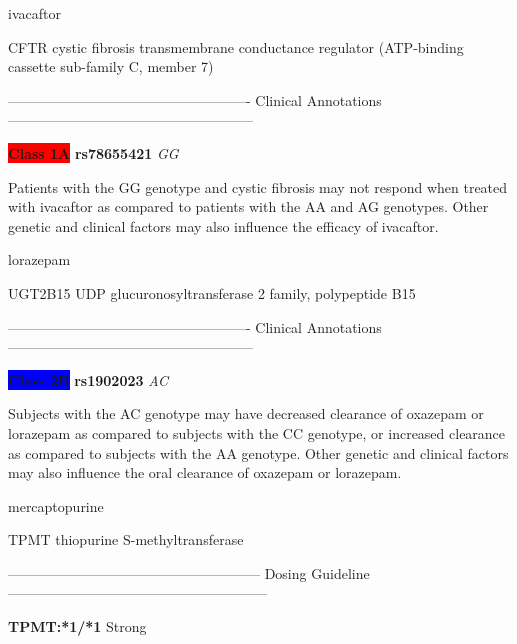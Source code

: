 \documentclass{resume} %
\begin{document}
\begin{rSection}{ ivacaftor }
\begin{rSubsection}{ CFTR }{ cystic fibrosis transmembrane conductance regulator (ATP-binding cassette sub-family C, member 7) }{}{}
\item[] ---------------------------------------------------- Clinical Annotations -----------------------------------------------------\newline
\item \textbf{\colorbox{red} {Class 1A}} \textbf{ rs78655421 } \textit{ GG }
\item[] Patients with the GG genotype and cystic fibrosis may not respond when treated with ivacaftor as compared to patients with the AA and AG genotypes. Other genetic and clinical factors may also influence the efficacy of ivacaftor.
\end{rSubsection}

\end{rSection}\begin{rSection}{ lorazepam }
\item[]

\begin{rSubsection}{ UGT2B15 }{ UDP glucuronosyltransferase 2 family, polypeptide B15 }{}{}
\item[]

\item[] ---------------------------------------------------- Clinical Annotations -----------------------------------------------------\newline
\item \textbf{\colorbox{blue} {Class 2B}} \textbf{ rs1902023 } \textit{ AC }
\item[] Subjects with the AC genotype may have decreased clearance of oxazepam or lorazepam as compared to subjects with the CC genotype, or increased clearance as compared to subjects with the AA genotype. Other genetic and clinical factors may also influence the oral clearance of oxazepam or lorazepam.
\end{rSubsection}

\end{rSection}\begin{rSection}{ mercaptopurine }
\item[]

\begin{rSubsection}{ TPMT }{ thiopurine S-methyltransferase }{}{}
\item[]
\item[] ------------------------------------------------------ Dosing Guideline --------------------------------------------------------\newline
\item[] \textbf{ TPMT:*1/*1 } Strong


\end{rSubsection}
\end{rSection}
\end{document}
